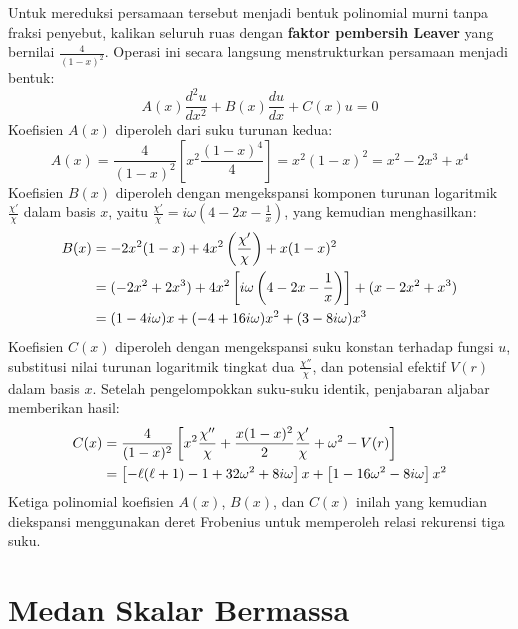 Untuk mereduksi persamaan tersebut menjadi bentuk polinomial murni tanpa fraksi penyebut, kalikan seluruh ruas dengan \textbf{faktor pembersih Leaver} yang bernilai $\frac{4}{(1-x)^2}$. Operasi ini secara langsung menstrukturkan persamaan menjadi bentuk:
\begin{equation}
    A(x) \frac{d^2u}{dx^2} + B(x) \frac{du}{dx} + C(x)u = 0
\end{equation}
Koefisien $A(x)$ diperoleh dari suku turunan kedua:
\begin{equation}
    A(x) = \frac{4}{(1-x)^2} \left[ x^2 \frac{(1-x)^4}{4} \right] = x^2(1-x)^2 = x^2 - 2x^3 + x^4
\end{equation}
Koefisien $B(x)$ diperoleh dengan mengekspansi komponen turunan logaritmik $\frac{\chi'}{\chi}$ dalam basis $x$, yaitu $\frac{\chi'}{\chi} = i\omega \left( 4 - 2x - \frac{1}{x} \right)$, yang kemudian menghasilkan:
\begin{align}
    B(x) &= -2x^2(1-x) + 4x^2 \left(\frac{\chi'}{\chi}\right) + x(1-x)^2 \notag \\
    &= (-2x^2 + 2x^3) + 4x^2 \left[ i\omega \left( 4 - 2x - \frac{1}{x} \right) \right] + (x - 2x^2 + x^3) \notag \\
    &= (1-4i\omega)x + (-4+16i\omega)x^2 + (3-8i\omega)x^3
\end{align}
Koefisien $C(x)$ diperoleh dengan mengekspansi suku konstan terhadap fungsi $u$, substitusi nilai turunan logaritmik tingkat dua $\frac{\chi''}{\chi}$, dan potensial efektif $V(r)$ dalam basis $x$. Setelah pengelompokkan suku-suku identik, penjabaran aljabar memberikan hasil:
\begin{align}
    C(x) &= \frac{4}{(1-x)^2} \left[ x^2 \frac{\chi''}{\chi} + \frac{x(1-x)^2}{2} \frac{\chi'}{\chi} + \omega^2 - V(r) \right] \notag \\
    &= \left[-\ell(\ell+1)-1+32\omega^2+8i\omega\right]x + \left[1-16\omega^2-8i\omega\right]x^2
\end{align}
\noindent
Ketiga polinomial koefisien $A(x)$, $B(x)$, dan $C(x)$ inilah yang kemudian diekspansi menggunakan deret Frobenius untuk memperoleh relasi rekurensi tiga suku.

\section{Medan Skalar Bermassa}

